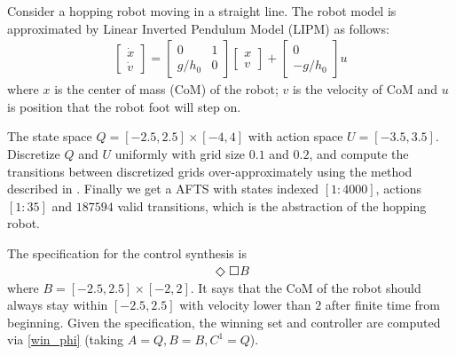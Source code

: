Consider a hopping robot moving in a straight line. The robot model is approximated by  Linear Inverted Pendulum Model (LIPM) as follows:
\begin{align}
\begin{bmatrix}
\dot{x}\\
\dot{v}
\end{bmatrix} = \begin{bmatrix}
0 & 1\\
g/h_0 & 0
\end{bmatrix}\begin{bmatrix}
x\\
v
\end{bmatrix}+\begin{bmatrix}
0\\-g/h_0
\end{bmatrix} u \label{eqn: model}
\end{align}
where $x$ is the center of mass (CoM) of the robot; $v$ is the velocity of CoM and $ u $ is position that the robot foot will step on. 

The state space $ Q = [-2.5,2.5]\times [-4,4] $ with action space $ U = [-3.5,3.5] $. Discretize $ Q $ and $ U $ uniformly with grid size $ 0.1 $ and $ 0.2 $, and compute the transitions between discretized grids over-approximately  using the method described in \cite{Liu2014,Sun2014}. Finally we get a AFTS with states indexed $ [1:4000] $, actions $ [1:35] $ and $ 187594 $ valid transitions, which is the abstraction of the hopping robot. 

The specification for the control synthesis is 
\begin{align}
\Diamond \Square B
\end{align}
where $ B=[-2.5,2.5]\times[-2,2] $. It says that the CoM of the robot should always stay within $ [-2.5,2.5] $ with velocity lower than $ 2 $ after finite time from beginning. Given the specification, the winning set and controller are computed via \eqref{win_phi} (taking $ A = Q,B=B , C^1 = Q $).

